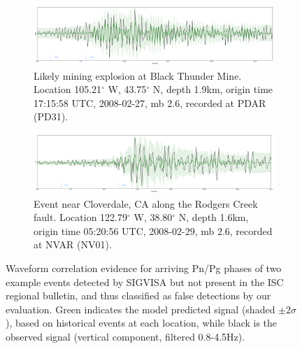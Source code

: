 \documentclass[twoside]{article} \usepackage{aistats2017}
\renewcommand{\deg}{\ensuremath{^\circ}}
\begin{document}
\begin{figure}
\centering
\begin{subfigure}[b]{0.45\textwidth}
    \includegraphics[width=\textwidth]{pd31_missed}
    \caption{Likely mining explosion at Black Thunder Mine. Location 105.21$\deg$ W, 43.75$\deg$ N, depth 1.9km, origin time 17:15:58 UTC, 2008-02-27, mb 2.6, recorded at PDAR (PD31).}
\end{subfigure}

\begin{subfigure}[b]{0.45\textwidth}
    \includegraphics[width=\textwidth]{nv01_missed}
    \caption{Event near Cloverdale, CA along the Rodgers Creek
      fault. Location 122.79$\deg$ W, 38.80$\deg$ N, depth 1.6km,
      origin time 05:20:56 UTC, 2008-02-29,  mb 2.6, recorded at NVAR
      (NV01).}
\end{subfigure}
\caption{Waveform correlation evidence for arriving Pn/Pg phases of two example events detected by SIGVISA
  but not present in the ISC regional bulletin, and thus classified as
  false detections by our evaluation. Green indicates the model
  predicted signal (shaded $\pm 2\sigma$), based on
historical events at each location, while black is the observed
signal (vertical component, filtered 0.8-4.5Hz).}
  \label{fig:sigvisa_genuine_evs}
\end{figure}
\end{document}
